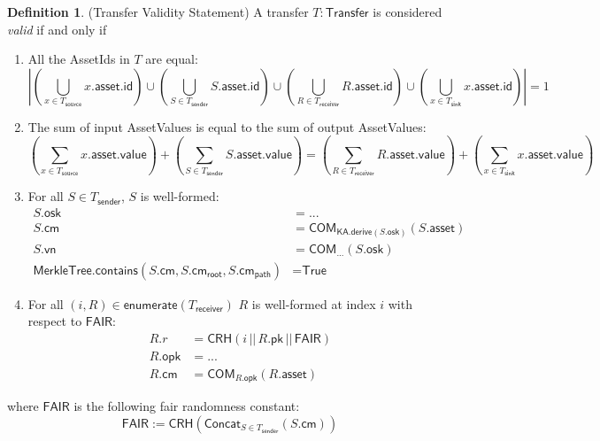 \documentclass[a4paper]{article}
\theoremstyle{definition}
\newtheorem{definition}{Definition}[subsection]
\renewcommand{\abs}[1]{\left|#1\right|}
\newcommand{\AssetId}{{\textsf{AssetId}}}
\newcommand{\AssetValue}{{\textsf{AssetValue}}}
\newcommand{\COM}{{\textsf{COM}}}
\newcommand{\CRH}{{\textsf{CRH}}}
\newcommand{\Concat}{{\textsf{Concat}}}
\newcommand{\Enumerate}{{\textsf{enumerate}}}
\newcommand{\FAIR}{{\textsf{FAIR}}}
\newcommand{\ID}{{\textsf{id}}}
\newcommand{\KA}{{\textsf{KA}}}
\newcommand{\MerkleTree}{{\textsf{MerkleTree}}}
\newcommand{\PATH}{{\textsf{path}}}
\newcommand{\ROOT}{{\textsf{root}}}
\newcommand{\Statement}{{\textsf{Statement}}}
\newcommand{\Transfer}{{\textsf{Transfer}}}
\newcommand{\True}{{\textsf{True}}}
\newcommand{\VALUE}{{\textsf{value}}}
\newcommand{\asset}{{\textsf{asset}}}
\newcommand{\cm}{{\textsf{cm}}}
\newcommand{\contains}{{\textsf{contains}}}
\newcommand{\derive}{{\textsf{derive}}}
\newcommand{\opk}{{\textsf{opk}}}
\newcommand{\osk}{{\textsf{osk}}}
\newcommand{\pk}{{\textsf{pk}}}
\newcommand{\receiver}{{\textsf{receiver}}}
\newcommand{\sender}{{\textsf{sender}}}
\newcommand{\sink}{{\textsf{sink}}}
\newcommand{\source}{{\textsf{source}}}
\newcommand{\vn}{{\textsf{vn}}}
\begin{document}
\begin{definition}(\Transfer{} Validity \Statement{}) A transfer $T : \Transfer$ is considered \emph{valid} if and only if
    \begin{enumerate}
        \item All the \AssetId{s} in $T$ are equal:
            \[
                \abs{
                    \left(\bigcup_{x \in T_\source} x.\asset.\ID \right)
                    \cup
                    \left(\bigcup_{S \in T_\sender} S.\asset.\ID \right)
                    \cup
                    \left(\bigcup_{R \in T_\receiver} R.\asset.\ID \right)
                    \cup
                    \left(\bigcup_{x \in T_\sink} x.\asset.\ID \right)
                } = 1
            \]
        \item The sum of input \AssetValue{s} is equal to the sum of output \AssetValue{s}:
            \[
                \left(\sum_{x \in T_\source} x.\asset.\VALUE\right)
                +
                \left(\sum_{S \in T_\sender} S.\asset.\VALUE\right)
                =
                \left(\sum_{R \in T_\receiver} R.\asset.\VALUE\right)
                +
                \left(\sum_{x \in T_\sink} x.\asset.\VALUE\right)
            \]
        \item For all $S \in T_\sender$, $S$ is well-formed:
            \begin{align*}
                S.\osk &= ... \\
                S.\cm &= \COM_{\KA.\derive(S.\osk)}(S.\asset) \\
                S.\vn &= \COM_{...}(S.\osk) \\
                \MerkleTree.\contains(S.\cm, S.\cm_\ROOT, S.\cm_\PATH) &= \True
            \end{align*}
        \item For all $(i, R) \in \Enumerate(T_\receiver)$ $R$ is well-formed at index $i$ with respect to $\FAIR$:
            \begin{align*}
                R.r &= \CRH(i \,||\, R.\pk \,||\, \FAIR) \\
                R.\opk &= ... \\
                R.\cm &= \COM_{R.\opk}(R.\asset)
            \end{align*}
    \end{enumerate}
    where $\FAIR$ is the following fair randomness constant:
    \[\FAIR := \CRH(\Concat_{S \in T_\sender}(S.\cm))\]
\end{definition}
\end{document}

